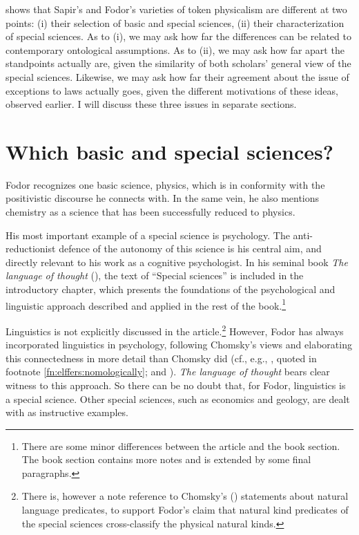 \documentclass[output=paper]{langscibook}
\begin{document}
 shows that Sapir's and Fodor's varieties of token physicalism are different at two points: (i) their selection of basic and special sciences, (ii) their characterization of special sciences. As to (i), we may ask how far the differences can be related to contemporary ontological assumptions. As to (ii), we may ask how far apart the standpoints actually are, given the similarity of both scholars' general view of the special sciences. Likewise, we may ask how far their agreement about the issue of exceptions to laws actually goes, given the different motivations of these ideas, observed earlier. I will discuss these three issues in separate sections.

\section{Which basic and special sciences?}
\label{sec:elffers:basicspecial}

Fodor recognizes one basic science, physics, which is in conformity with the positivistic discourse he connects with. In the same vein, he also mentions chemistry as a science that has been successfully reduced to physics.

His most important example of a special science is psychology. The anti-reductionist defence of the autonomy of this science is his central aim, and directly relevant to his work as a cognitive psychologist. In his seminal book \emph{The language of thought} (\citeyear{Fodor1975}), the text of ``Special sciences'' is included in the introductory chapter, which presents the foundations of the psychological and linguistic approach described and applied in the rest of the book.\footnote{There are some minor differences between the article and the book section. The book section contains more notes and is extended by some final paragraphs.}

Linguistics is not explicitly discussed in the \citeyear{Fodor1974} article.\footnote{There is, however a note reference to Chomsky's (\citeyear{Chomsky1965}) statements about natural language predicates, to support Fodor's claim that natural kind predicates of the special sciences cross-classify the physical natural kinds.} However, Fodor has always incorporated linguistics in psychology, following Chomsky's views and elaborating this connectedness in more detail than Chomsky did (cf., e.g., \citealt[149]{Fodor1985}, quoted in footnote \ref{fn:elffers:nomologically}; and \citealt[278]{LoewerRey1991}). \emph{The language of thought} bears clear witness to this approach. So there can be no doubt that, for Fodor, linguistics is a special science. Other special sciences, such as economics and geology, are dealt with as instructive examples.
\end{document}
